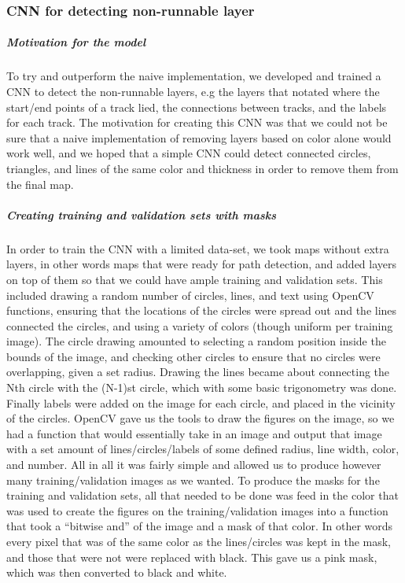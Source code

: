 \documentclass[a4paper,12pt]{extarticle}
\begin{document}
\subsubsection{CNN for detecting non-runnable layer}
\subparagraph{Motivation for the model\\}

To try and outperform the naive implementation, we developed and trained a CNN to detect the non-runnable layers, e.g the layers that notated where the start/end points of a track lied, the connections between tracks, and the labels for each track.
The motivation for creating this CNN was that we could not be sure that a naive implementation of removing layers based on color alone would work well, and we hoped that a simple CNN could detect connected circles, triangles, and lines of the same color and thickness in order to remove them from the final map. 

\subparagraph{Creating training and validation sets with masks\\}

In order to train the CNN with a limited data-set, we took maps without extra layers, in other words maps that were ready for path detection, and added layers on top of them so that we could have ample training and validation sets. This included drawing a random number of circles, lines, and text using OpenCV functions, ensuring that the locations of the circles were spread out and the lines connected the circles, and using a variety of colors (though uniform per training image). The circle drawing amounted to selecting a random position inside the bounds of the image, and checking other circles to ensure that no circles were overlapping, given a set radius. Drawing the lines became about connecting the Nth circle with the (N-1)st circle, which with some basic trigonometry was done. Finally labels were added on the image for each circle, and placed in the vicinity of the circles. OpenCV gave us the tools to draw the figures on the image, so we had a function that would essentially take in an image and output that image with a set amount of lines/circles/labels of some defined radius, line width, color, and number. All in all it was fairly simple and allowed us to produce however many training/validation images as we wanted. To produce the masks for the training and validation sets, all that needed to be done was feed in the color that was used to create the figures on the training/validation images into a function that took a “bitwise and” of the image and a mask of that color. In other words every pixel that was of the same color as the lines/circles was kept in the mask, and those that were not were replaced with black. This gave us a pink mask, which was then converted to black and white.
\end{document}
